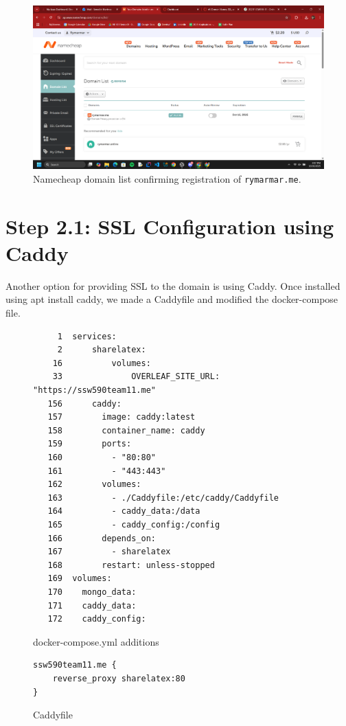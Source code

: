 \begin{figure}[H]
    \centering
    \includegraphics[width=\textwidth]{png/DomainNames/domain_list.png}
    \caption{Namecheap domain list confirming registration of \texttt{rymarmar.me}.}
\end{figure}
\section{Step 2.1: SSL Configuration using Caddy}

Another option for providing SSL to the domain is using Caddy. Once installed using apt install caddy, we made a Caddyfile and modified the docker-compose file.    
\begin{figure}[H]
\begin{verbatim}
     1	services:
     2	    sharelatex:
    16	        volumes:
    33	            OVERLEAF_SITE_URL: "https://ssw590team11.me"
   156	    caddy:
   157	      image: caddy:latest
   158	      container_name: caddy
   159	      ports:
   160	        - "80:80"
   161	        - "443:443"
   162	      volumes:
   163	        - ./Caddyfile:/etc/caddy/Caddyfile
   164	        - caddy_data:/data
   165	        - caddy_config:/config
   166	      depends_on:
   167	        - sharelatex
   168	      restart: unless-stopped
   169	volumes:
   170	  mongo_data:
   171	  caddy_data:
   172	  caddy_config:
\end{verbatim}
\caption{docker-compose.yml additions}
\end{figure}

\begin{figure}[H]
\begin{verbatim}
ssw590team11.me {
	reverse_proxy sharelatex:80
}
\end{verbatim}
\caption{Caddyfile}
\end{figure}

